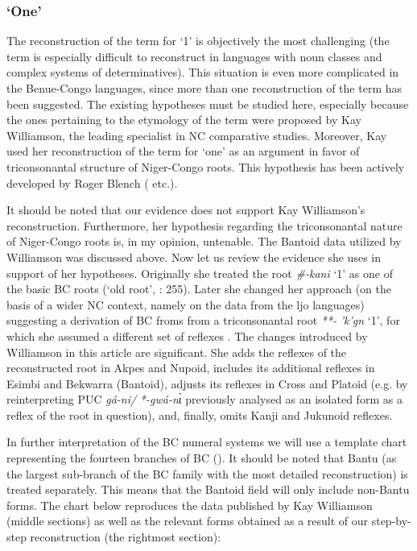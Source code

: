 \subsubsection{‘One’}\label{sec:3.1.4.1}
The reconstruction of the term for ‘1’ is objectively the most challenging (the term is especially difficult to reconstruct in languages with noun classes and complex systems of determinatives). This situation is even more complicated in the Benue-Congo languages, since more than one reconstruction of the term has been suggested. The existing hypotheses must be studied here, especially because the ones pertaining to the etymology of the term were proposed by Kay Williamson, the leading specialist in NC comparative studies. Moreover, Kay \citet{Williamson1989b} used her reconstruction of the term for ‘one’ as an argument in favor of triconsonantal structure of Niger-Congo roots. This hypothesis has been actively developed by Roger Blench (\citeyear*{Blench2012a} etc.). 

It should be noted that our evidence does not support Kay Williamson’s reconstruction. Furthermore, her hypothesis regarding the triconsonantal nature of Niger-Congo roots is, in my opinion, untenable. The Bantoid data utilized by Williamson was discussed above. Now let us review the evidence she uses in support of her hypotheses. Originally she treated the root \textit{\#-kani} ‘1’ as one of the basic BC roots (‘old root’, \citealt{Williamson1989b}: 255). Later she changed her approach (on the basis of a wider NC context, namely on the data from the ljo languages) suggesting a derivation of BC froms from a triconsonantal root \textit{**-} \textit{'k{}'g{}n{}} ‘1’, for which she assumed a different set of reflexes \citep[396]{Williamson1992}. The changes introduced by Williamson in this article are significant. She adds the reflexes of the reconstructed root in Akpes and Nupoid, includes its additional reflexes in Esimbi and Bekwarra (Bantoid), adjusts its reflexes in Cross and Platoid (e.g. by reinterpreting PUC \textit{gá-ni/} \textit{*-gwá-n{\`{ɩ}}} previously analysed as an isolated form as a reflex of the root in question), and, finally, omits Kanji and Jukunoid reflexes.

In further interpretation of the BC numeral systems we will use a template chart representing the fourteen branches of BC (). It should be noted that Bantu (as the largest sub-branch of the BC family with the most detailed reconstruction) is treated separately. This means that the Bantoid field will only include non-Bantu forms. The chart below reproduces the data published by Kay Williamson (middle sections) as well as the relevant forms obtained as a result of our step-by-step reconstruction (the rightmost section):

